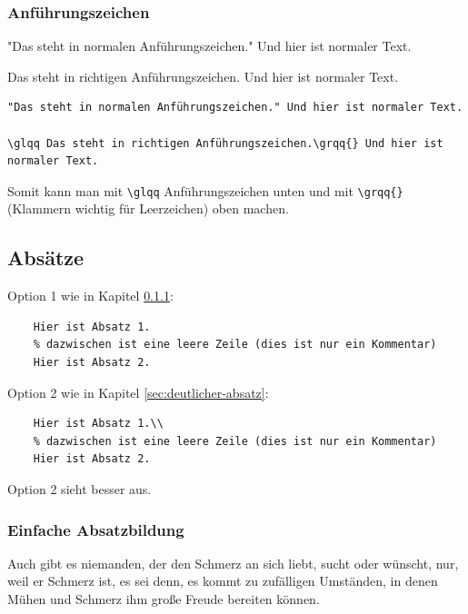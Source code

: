 

\subsubsection{Anführungszeichen}

"Das steht in normalen Anführungszeichen." Und hier ist normaler Text.

\glqq Das steht in richtigen Anführungszeichen.\grqq{} Und hier ist
normaler Text.

\begin{verbatim}
"Das steht in normalen Anführungszeichen." Und hier ist normaler Text.

\glqq Das steht in richtigen Anführungszeichen.\grqq{} Und hier ist
normaler Text.
\end{verbatim}

Somit kann man mit \verb|\glqq| Anführungszeichen unten und mit \verb|\grqq{}| (Klammern wichtig für Leerzeichen) oben machen.

\subsection{Absätze} \label{sec:absatz}

Option 1 wie in Kapitel \ref{sec:einfacher-absatz}:

\begin{verbatim}
    Hier ist Absatz 1.
    % dazwischen ist eine leere Zeile (dies ist nur ein Kommentar)
    Hier ist Absatz 2.
\end{verbatim}

Option 2 wie in Kapitel \ref{sec:deutlicher-absatz}:

\begin{verbatim}
    Hier ist Absatz 1.\\
    % dazwischen ist eine leere Zeile (dies ist nur ein Kommentar)
    Hier ist Absatz 2.
\end{verbatim}

Option 2 sieht besser aus.


\subsubsection{Einfache Absatzbildung} \label{sec:einfacher-absatz}

Auch gibt es niemanden, der den Schmerz an sich liebt, sucht oder wünscht, nur, weil er Schmerz ist, es sei denn, es kommt zu zufälligen Umständen, in denen Mühen und Schmerz ihm große Freude bereiten können. %

